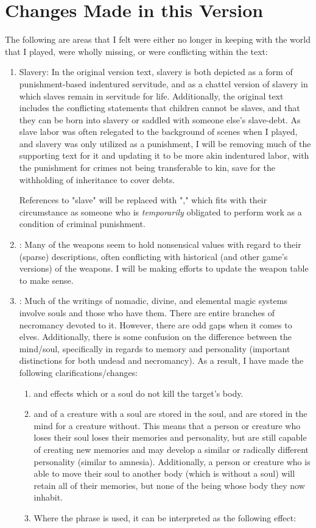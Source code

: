 \chapter{Changes Made in this Version}
\label{ch:changes}
The following are areas that I felt were either no longer in keeping with the world that I played, were wholly missing, or were conflicting within the text:
\begin{enumerate}[leftmargin=12pt]
\item Slavery: In the original version text, slavery is both depicted as a form of punishment-based indentured servitude, and as a chattel version of slavery in which slaves remain in servitude for life. Additionally, the original text includes the conflicting statements that children cannot be slaves, and that they can be born into slavery or saddled with someone else's slave-debt. As slave labor was often relegated to the background of scenes when I played, and slavery was only utilized as a punishment, I will be removing much of the supporting text for it and updating it to be more akin indentured labor, with the punishment for crimes not being transferable to kin, save for the withholding of inheritance to cover debts. 

References to "slave" will be replaced with "," which fits with their circumstance as someone who is \textit{temporarily} obligated to perform work as a condition of criminal punishment. 
\item {}: Many of the weapons seem to hold nonsensical values with regard to their (sparse) descriptions, often conflicting with historical (and other game's versions) of the weapons. I will be making efforts to update the weapon table to make sense.
\item {}: Much of the writings of nomadic, divine, and elemental magic systems involve souls and those who have them. There are entire branches of necromancy devoted to it. However, there are odd gaps when it comes to elves. Additionally, there is some confusion on the difference between the mind/soul, specifically in regards to memory and personality (important distinctions for both undead and necromancy). As a result, I have made the following clarifications/changes:
\begin{enumerate}
	\item {} and effects which  or  a soul do not kill the target's body.
	\item {} and  of a creature with a soul are stored in the soul, and are stored in the mind for a creature without. This means that a person or creature who loses their soul loses their memories and personality, but are still capable of creating new memories and may develop a similar or radically different personality (similar to amnesia). Additionally, a person or creature who is able to move their soul to another body (which is without a soul) will retain all of their memories, but none of the being whose body they now inhabit.
	\item Where the phrase  is used, it can be interpreted as the following effect:


\end{enumerate}
\end{enumerate}
